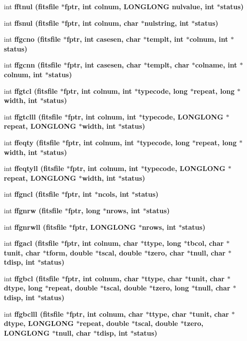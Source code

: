 \begin{CompactItemize}
\item 
int \bf{fftnul} (\bf{fitsfile} $\ast$fptr, int colnum, \bf{LONGLONG} nulvalue, int $\ast$status)
\item 
int \bf{ffsnul} (\bf{fitsfile} $\ast$fptr, int colnum, char $\ast$nulstring, int $\ast$status)
\item 
int \bf{ffgcno} (\bf{fitsfile} $\ast$fptr, int casesen, char $\ast$templt, int $\ast$colnum, int $\ast$status)
\item 
int \bf{ffgcnn} (\bf{fitsfile} $\ast$fptr, int casesen, char $\ast$templt, char $\ast$colname, int $\ast$colnum, int $\ast$status)
\item 
int \bf{ffgtcl} (\bf{fitsfile} $\ast$fptr, int colnum, int $\ast$typecode, long $\ast$repeat, long $\ast$width, int $\ast$status)
\item 
int \bf{ffgtclll} (\bf{fitsfile} $\ast$fptr, int colnum, int $\ast$typecode, \bf{LONGLONG} $\ast$repeat, \bf{LONGLONG} $\ast$width, int $\ast$status)
\item 
int \bf{ffeqty} (\bf{fitsfile} $\ast$fptr, int colnum, int $\ast$typecode, long $\ast$repeat, long $\ast$width, int $\ast$status)
\item 
int \bf{ffeqtyll} (\bf{fitsfile} $\ast$fptr, int colnum, int $\ast$typecode, \bf{LONGLONG} $\ast$repeat, \bf{LONGLONG} $\ast$width, int $\ast$status)
\item 
int \bf{ffgncl} (\bf{fitsfile} $\ast$fptr, int $\ast$ncols, int $\ast$status)
\item 
int \bf{ffgnrw} (\bf{fitsfile} $\ast$fptr, long $\ast$nrows, int $\ast$status)
\item 
int \bf{ffgnrwll} (\bf{fitsfile} $\ast$fptr, \bf{LONGLONG} $\ast$nrows, int $\ast$status)
\item 
int \bf{ffgacl} (\bf{fitsfile} $\ast$fptr, int colnum, char $\ast$ttype, long $\ast$tbcol, char $\ast$tunit, char $\ast$tform, double $\ast$tscal, double $\ast$tzero, char $\ast$tnull, char $\ast$tdisp, int $\ast$status)
\item 
int \bf{ffgbcl} (\bf{fitsfile} $\ast$fptr, int colnum, char $\ast$ttype, char $\ast$tunit, char $\ast$dtype, long $\ast$repeat, double $\ast$tscal, double $\ast$tzero, long $\ast$tnull, char $\ast$tdisp, int $\ast$status)
\item 
int \bf{ffgbclll} (\bf{fitsfile} $\ast$fptr, int colnum, char $\ast$ttype, char $\ast$tunit, char $\ast$dtype, \bf{LONGLONG} $\ast$repeat, double $\ast$tscal, double $\ast$tzero, \bf{LONGLONG} $\ast$tnull, char $\ast$tdisp, int $\ast$status)
\item 

\end{CompactItemize}

